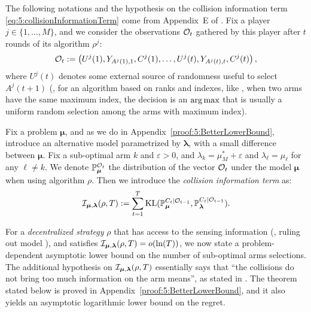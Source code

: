 The following notations and the hypothesis on the collision information term \eqref{eq:5:collisionInformationTerm} come from Appendix~E of \cite{KaufmannAbbas19}.
Fix a player $j\in\{1,\dots,M\}$, and we consider the observations $\mathcal{O}_t$ gathered by this player after $t$ rounds of its algorithm $\rho^j$:
\[ \mathcal{O}_t := \left( U^j(1), Y_{A^j(1),1}, C^j(1), \ldots, U^j(t), Y_{A^j(t),t}, C^j(t) \right),\]
where $U^j(t)$ denotes some external source of randomness useful to select $A^j(t+1)$ (\eg, for an algorithm based on ranks and \UCB{} indexes, like \RhoRand, when two arms have the same maximum index, the decision is an $\operatorname*{arg\,max}$ that is usually a uniform random selection among the arms with maximum index).

Fix a problem $\bm{\mu}$, and as we do in Appendix~\ref{proof:5:BetterLowerBound}, introduce an alternative model parametrized by $\bm{\lambda}$, with a small difference between $\bm{\mu}$.
Fix a sub-optimal arm $k$ and $\varepsilon>0$, and $\lambda_k = \mu^*_M + \varepsilon$ and $\lambda_{\ell} = \mu_{\ell}$ for any $\ell\neq k$.
We denote $\mathbb{P}_{\bm{\mu}}^{\mathcal{O}_t}$ the distribution of the vector $\mathcal{O}_t$ under the model $\bm{\mu}$ when using algorithm $\rho$.
Then we introduce the \emph{collision information term} as:
\begin{equation}\label{eq:5:collisionInformationTerm}
  \mathcal{I}_{\bm{\mu},\bm{\lambda}}(\rho,T) := \sum_{t=1}^{T} \mathrm{KL}(\mathbb{P}_{\bm{\mu}}^{C_t | \mathcal{O}_{t-1}}, \mathbb{P}_{\bm{\lambda}}^{C_t | \mathcal{O}_{t-1}}).
\end{equation}

For a \emph{decentralized strategy} $\rho$ that has access to the sensing information (\ie, ruling out model \modeltrois), and satisfies $\mathcal{I}_{\bm{\mu},\bm{\lambda}}(\rho,T) = \mathop{}\mathopen{}o\mathopen{}\left(\ln(T)\right)$,
we now state a problem-dependent asymptotic lower bound on the number of sub-optimal arms selections.
The additional hypothesis on $\mathcal{I}_{\bm{\mu},\bm{\lambda}}(\rho,T)$ essentially says that ``the collisions do not bring too much information on the arm means'', as stated in \cite{KaufmannAbbas19}.
The theorem stated below is proved in Appendix~\ref{proof:5:BetterLowerBound}, and it also yields an asymptotic logarithmic lower bound on the regret.

